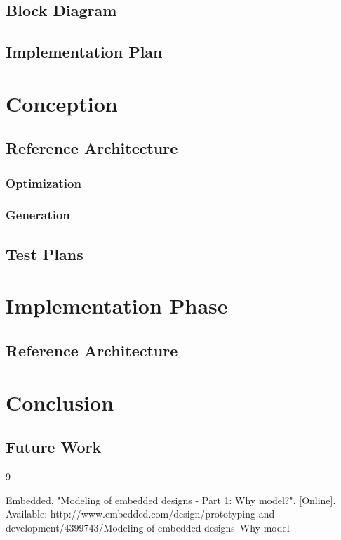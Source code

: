 \documentclass{report}
\begin{document}
    \section{Block Diagram}
    
    \section{Implementation Plan}
    
    \chapter{Conception}
    
    \section{Reference Architecture}
    
    \subsection{Optimization}
    
    \subsection{Generation}
    
    \section{Test Plans}
    
    \chapter{Implementation Phase}
    
    \section{Reference Architecture}
    
    \chapter{Conclusion}
    
    \section{Future Work}
    
	
	\newpage
		
	\begin{thebibliography} {9}
		
		 Embedded, "Modeling of embedded designs - Part 1: Why model?". [Online]. Available: http://www.embedded.com/design/prototyping-and-development/4399743/Modeling-of-embedded-designs--Why-model--
				
	\end{thebibliography}
	
\end{document}
